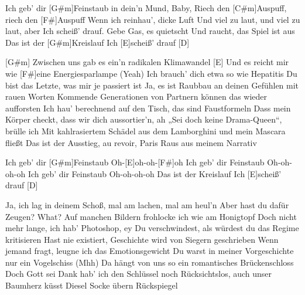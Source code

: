 

\begin{guitar}
	Ich geb' dir [G#m]Feinstaub in dein'n Mund, Baby, 
	Riech den [C#m]Auspuff, riech den [F#]Auspuff
	Wenn ich reinhau', dicke Luft 
	Und viel zu laut, und viel zu laut, aber 
	Ich scheiß' drauf. Gebe Gas, es quietscht
	Und raucht, das Spiel ist aus
	Das ist der [G#m]Kreislauf
	Ich [E]scheiß' drauf [D]{}
	
	[G#m] Zwischen uns gab es ein'n radikalen Klimawandel
	[E] Und es reicht mir wie [F#]eine Energiesparlampe (Yeah)
	Ich brauch' dich etwa so wie Hepatitis
	Du bist das Letzte, was mir je passiert ist
	Ja, es ist Raubbau an deinen Gefühlen mit rauen Worten
	Kommende Generationen von Partnern können das wieder aufforsten
	Ich hau' berechnend auf den Tisch, das sind Faustformeln
	Dass mein Körper checkt, dass wir dich aussortier'n, ah
	„Sei doch keine Drama-Queen“, brülle ich 
	Mit kahlrasiertem Schädel aus dem Lamborghini und mein Mascara fließt
	Das ist der Ausstieg, au revoir, Paris
	Raus aus meinem Narrativ
	
	 

	Ich geb' dir [G#m]Feinstaub
	Oh-[E]oh-oh-[F#]oh
	Ich geb' dir Feinstaub
	Oh-oh-oh-oh
	Ich geb' dir Feinstaub
	Oh-oh-oh-oh
	Das ist der Kreislauf
	Ich [E]scheiß' drauf [D]{}
	
	Ja, ich lag in deinem Schoß, mal am lachen, mal am heul'n
	Aber hast du dafür Zeugen? What?
	Auf manchen Bildern frohlocke ich wie am Honigtopf
	Doch nicht mehr lange, ich hab' Photoshop, ey
	Du verschwindest, als würdest du das Regime kritisieren
	Hast nie existiert, Geschichte wird von Siegern geschrieben
	Wenn jemand fragt, leugne ich das Emotionsgewicht
	Du warst in meiner Vorgeschichte nur ein Vogelschiss (Mhh)
	Da hängt von uns so ein romantisches Brückenschloss
	Doch Gott sei Dank hab' ich den Schlüssel noch
	Rücksichtslos, auch unser Baumherz küsst Diesel
	Socke übern Rückspiegel
	
	 
	
	 
	

\end{guitar}

